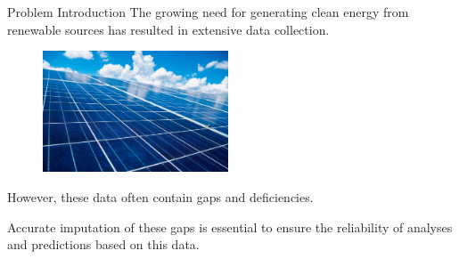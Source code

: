   \begin{frame}{Problem Introduction}
      \small
          The growing need for generating clean energy from renewable sources has resulted in extensive data collection.
          
        \begin{figure}
            \includegraphics[width=5.5cm]{sections/0_intro/imgs/plant.jpg}
        \end{figure}
        
          However, these data often contain gaps and deficiencies. 
          
          Accurate imputation of these gaps is essential to ensure the reliability of analyses and predictions based on this data.
%        
%    
  \end{frame}